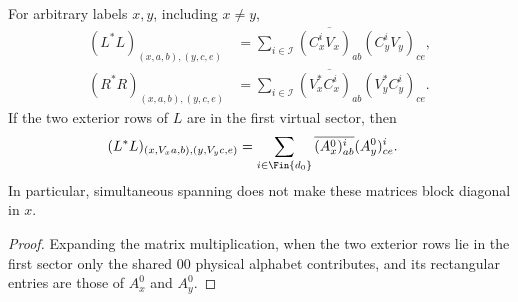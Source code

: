 \begin{lemma}
    \label{thm:mpo_joint_boundary_gram}
    \leanok
    For arbitrary labels $x,y$, including $x\ne y$,
    \begin{align}
        (L^*L)_{(x,a,b),(y,c,e)}
         & =\sum_{i\in\mathcal I}
        \overline{(C_x^iV_x)_{ab}}(C_y^iV_y)_{ce}, \\
        (R^*R)_{(x,a,b),(y,c,e)}
         & =\sum_{i\in\mathcal I}
        \overline{(V_x^*C_x^i)_{ab}}(V_y^*C_y^i)_{ce}.
    \end{align}
    If the two exterior rows of $L$ are in the first virtual sector,
    then
    \begin{align}
        (L^*L)_{(x,V_xa,b),(y,V_yc,e)}
         & =\sum_{i\in\Fin{d_0}}
        \overline{(A_x^0)^i_{ab}}(A_y^0)^i_{ce}.
    \end{align}
    In particular, simultaneous spanning does not make these matrices
    block diagonal in $x$.
\end{lemma}
\begin{proof}
    \leanok
    Expanding the matrix multiplication, when the two exterior rows lie
    in the first sector only the shared $00$ physical alphabet contributes,
    and its rectangular entries are those of $A_x^0$ and $A_y^0$.
\end{proof}

